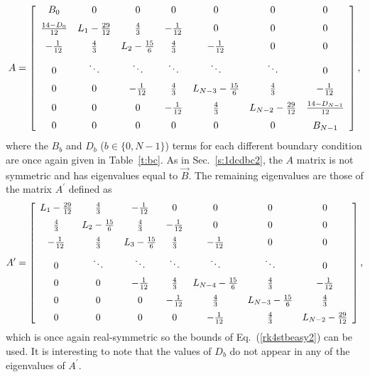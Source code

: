 \documentclass{article}
\begin{document}
\[
A = \left[\begin {array}{cccccccc}
B_0         & 0         & 0        & 0      & 0            & 0             & 0 \\\noalign{\medskip}
\frac{14-D_0}{12} & L_1-\frac{29}{12} & \frac{4}{3}     & -\frac{1}{12}  & 0            & 0             & 0 \\\noalign{\medskip}
-\frac{1}{12}       & \frac{4}{3}       & L_2-\frac{15}{6} & \frac{4}{3}    & -\frac{1}{12}        & 0             & 0 \\\noalign{\medskip}
0           & \ddots    & \ddots   & \ddots & \ddots       & \ddots        & 0 \\\noalign{\medskip}
0           & 0         &-\frac{1}{12}    & \frac{4}{3}    & L_{N-3}-\frac{15}{6} & \frac{4}{3}           & -\frac{1}{12} \\\noalign{\medskip}
0           & 0         & 0        & -\frac{1}{12}  & \frac{4}{3}          & L_{N-2}-\frac{29}{12} & \frac{14-D_{N-1}}{12} \\\noalign{\medskip}
0           & 0         & 0        & 0      & 0            & 0             & B_{N-1}
\end {array} \right],
\]
where the $B_b$ and $D_b$ ($b\in\{0,N-1\}$) terms for each different boundary condition are once again given in Table~\ref{t:bc}.  As in Sec.~\ref{s:1dcdbc2}, the $A$ matrix is not symmetric and has eigenvalues equal to $\vec B$.  The remaining eigenvalues are those of the matrix $A^{\prime}$ defined as
\[
A^{\prime} = \left[\begin {array}{ccccccc}  
L_1-\frac{29}{12} & \frac{4}{3}      & -\frac{1}{12}    & 0      & 0            & 0            & 0 \\\noalign{\medskip}
\frac{4}{3}      & L_2-\frac{15}{6} & \frac{4}{3}       & -\frac{1}{12}  & 0            & 0            & 0 \\\noalign{\medskip}
-\frac{1}{12}     & \frac{4}{3}      & L_3-\frac{15}{6} & \frac{4}{3}    & -\frac{1}{12}        & 0            & 0 \\\noalign{\medskip}
0         & \ddots   & \ddots   & \ddots & \ddots       & \ddots       & 0 \\\noalign{\medskip}
0         & 0        & -\frac{1}{12}    & \frac{4}{3}     & L_{N-4}-\frac{15}{6} & \frac{4}{3}          & -\frac{1}{12} \\\noalign{\medskip}
0         & 0        & 0        & -\frac{1}{12}  & \frac{4}{3}           & L_{N-3}-\frac{15}{6} & \frac{4}{3} \\\noalign{\medskip}
0         & 0        & 0        & 0      & -\frac{1}{12}        & \frac{4}{3}          & L_{N-2}-\frac{29}{12}
\end {array} \right],
\]
which is once again real-symmetric so the bounds of Eq.~(\ref{rk4stbeasy2}) can be used.  It is interesting to note that the values of $D_b$ do not appear in any of the eigenvalues of $A^{\prime}$.
\end{document}
